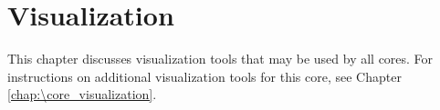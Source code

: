 
\chapter{Visualization}
\label{chap:mpas_visualization}

This chapter discusses visualization tools that may be used by all cores.  For instructions on additional visualization tools for this core, see Chapter \ref{chap:\core_visualization}.
